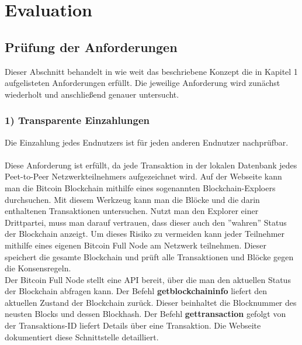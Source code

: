 \section{Evaluation}
\subsection{Prüfung der Anforderungen}\label{btc_evaluation}%

Dieser Abschnitt behandelt in wie weit das beschriebene Konzept die in Kapitel 1 aufgelisteten Anforderungen erfüllt. Die jeweilige Anforderung wird zunächst wiederholt und anschließend genauer untersucht.

\subsubsection{1) Transparente Einzahlungen}
Die Einzahlung jedes Endnutzers ist für jeden anderen Endnutzer nachprüfbar.\\\\
Diese Anforderung ist erfüllt, da jede Transaktion in der lokalen Datenbank jedes Peet-to-Peer Netzwerkteilnehmers aufgezeichnet wird. 
Auf der Webseite \cite{blockchain_info} kann man die Bitcoin Blockchain mithilfe eines sogenannten Blockchain-Exploers durchsuchen. Mit diesem Werkzeug kann man die Blöcke und die darin enthaltenen Transaktionen untersuchen. Nutzt man den Explorer einer Drittpartei, muss man darauf vertrauen, dass dieser auch den ''wahren'' Status der Blockchain anzeigt. Um dieses Risiko zu vermeiden kann jeder Teilnehmer mithilfe eines eigenen Bitcoin Full Node am Netzwerk teilnehmen. Dieser speichert die gesamte Blockchain und prüft alle Transaktionen und Blöcke gegen die Konsensregeln.\\
Der Bitcoin Full Node stellt eine API bereit, über die man den aktuellen Status der Blockchain abfragen kann. Der Befehl \textbf{getblockchaininfo} liefert den aktuellen Zustand der Blockchain zurück. Dieser beinhaltet die Blocknummer des neusten Blocks und dessen Blockhash. Der Befehl \textbf{gettransaction} gefolgt von der Transaktions-ID liefert Details über eine Transaktion. Die Webseite \cite{btc_api} dokumentiert diese Schnittstelle detailliert. 

